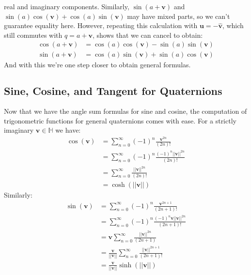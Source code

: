 \documentclass{article}
\theoremstyle{plain}
\theoremstyle{normal}
\begin{document}
            real and imaginary components. Similarly,
            $\sin(a+\mathbf{v})$ and
            $\sin(a)\cos(\mathbf{v})+\cos(a)\sin(\mathbf{v})$ may have mixed
            parts, so we can't guarantee equality here. However,
            repeating this calculation with $\mathbf{u}=-\hat{\mathbf{v}}$,
            which still commutes with $q=a+\mathbf{v}$, shows that we can cancel
            to obtain:
            \begin{align}
                \cos(a+\mathbf{v})
                &=\cos(a)\cos(\mathbf{v})-\sin(a)\sin(\mathbf{v})\\
                \sin(a+\mathbf{v})
                &=\cos(a)\sin(\mathbf{v})+\sin(a)\cos(\mathbf{v})
            \end{align}
            And with this we're one step closer to obtain general formulas.
        \subsection{Sine, Cosine, and Tangent for Quaternions}
            Now that we have the angle sum formulas for sine and cosine, the
            computation of trigonometric functions for general quaternions comes
            with ease. For a strictly imaginary $\mathbf{v}\in\mathbb{H}$
            we have:
            \begin{subequations}
                \begin{align}
                    \cos(\mathbf{v})
                    &=\sum_{n=0}^{\infty}(-1)^{n}\frac{\mathbf{v}^{2n}}{(2n)!}\\
                    &=\sum_{n=0}^{\infty}(-1)^{n}
                        \frac{(-1)^{n}||\mathbf{v}||^{2n}}{(2n)!}\\
                    &=\sum_{n=0}^{\infty}\frac{||\mathbf{v}||^{2n}}{(2n)!}\\
                    &=\cosh(||\mathbf{v}||)
                \end{align}
            \end{subequations}
            Similarly:
            \begin{subequations}
                \begin{align}
                    \sin(\mathbf{v})
                    &=\sum_{n=0}^{\infty}(-1)^{n}
                        \frac{\mathbf{v}^{2n+1}}{(2n+1)!}\\
                    &=\sum_{n=0}^{\infty}(-1)^{n}
                        \frac{(-1)^{n}\mathbf{v}||\mathbf{v}||^{2n}}{(2n+1)!}\\
                    &=\mathbf{v}\sum_{n=0}^{\infty}
                        \frac{||\mathbf{v}||^{2n}}{(2n+1)}\\
                    &=\frac{\mathbf{v}}{||\mathbf{v}||}
                        \sum_{n=0}^{\infty}
                        \frac{||\mathbf{v}||^{2n+1}}{(2n+1)!}\\
                    &=\frac{\mathbf{v}}{||\mathbf{v}||}\sinh(||\mathbf{v}||)
                \end{align}
            \end{subequations}
\end{document}
